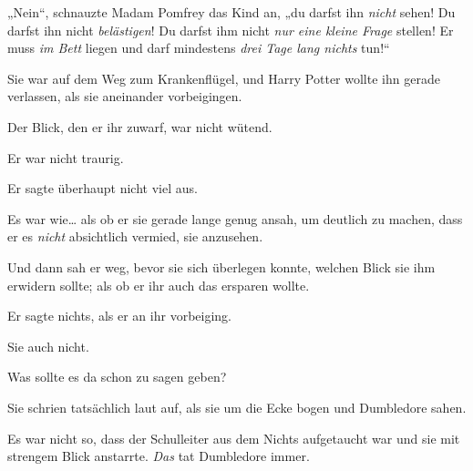 
„Nein“, schnauzte Madam Pomfrey das Kind an, „du darfst ihn \emph{nicht} sehen! Du darfst ihn nicht \emph{belästigen}! Du darfst ihm nicht \emph{nur eine kleine Frage} stellen! Er muss \emph{im Bett} liegen und darf mindestens \emph{drei Tage lang nichts} tun!“


Sie war auf dem Weg zum Krankenflügel, und Harry Potter wollte ihn gerade verlassen, als sie aneinander vorbeigingen.

Der Blick, den er ihr zuwarf, war nicht wütend.

Er war nicht traurig.

Er sagte überhaupt nicht viel aus.

Es war wie… als ob er sie gerade lange genug ansah, um deutlich zu machen, dass er es \emph{nicht} absichtlich vermied, sie anzusehen.

Und dann sah er weg, bevor sie sich überlegen konnte, welchen Blick sie ihm erwidern sollte; als ob er ihr auch das ersparen wollte.

Er sagte nichts, als er an ihr vorbeiging.

Sie auch nicht.

Was sollte es da schon zu sagen geben?


Sie schrien tatsächlich laut auf, als sie um die Ecke bogen und Dumbledore sahen.

Es war nicht so, dass der Schulleiter aus dem Nichts aufgetaucht war und sie mit strengem Blick anstarrte. \emph{Das} tat Dumbledore immer.

